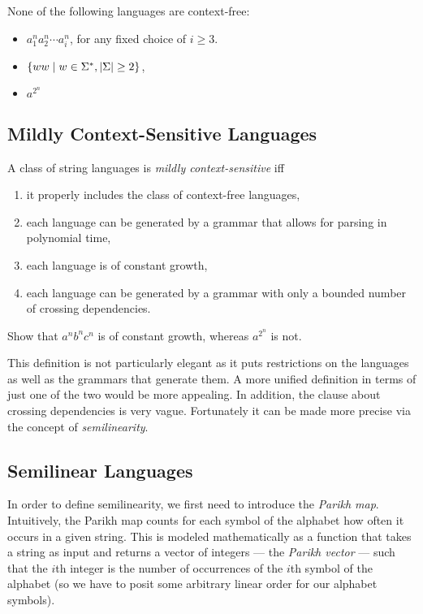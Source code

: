 %
\begin{lemma}
    None of the following languages are context-free:
    \begin{itemize}
        \item $a_1^n a_2^n \cdots a_i^n$, for any fixed choice of $i \geq 3$.
        \item $\left \{ ww \mid w \in \Sigma^*, | \Sigma | \geq 2 \right \}$,
        \item $a^{2^n}$
    \end{itemize}
\end{lemma}

\subsection{Mildly Context-Sensitive Languages}

\begin{definition}
    A class of string languages is \emph{mildly context-sensitive} iff
    \begin{enumerate}
        \item it properly includes the class of context-free languages,
        \item each language can be generated by a grammar that allows for parsing in polynomial time,
        \item each language is of constant growth,
        \item each language can be generated by a grammar with only a bounded number of crossing dependencies.
    \end{enumerate}
\end{definition}
%
\begin{exercise}
    Show that $a^n b^n c^n$ is of constant growth, whereas $a^{2^n}$ is not.
\end{exercise}
%
This definition is not particularly elegant as it puts restrictions on the languages as well as the grammars that generate them.
A more unified definition in terms of just one of the two would be more appealing.
In addition, the clause about crossing dependencies is very vague.
Fortunately it can be made more precise via the concept of \emph{semilinearity}.

\subsection{Semilinear Languages}

In order to define semilinearity, we first need to introduce the \emph{Parikh map}.
Intuitively, the Parikh map counts for each symbol of the alphabet how often it occurs in a given string.
This is modeled mathematically as a function that takes a string as input and returns a vector of integers --- the \emph{Parikh vector} --- such that the $i$th integer is the number of occurrences of the $i$th symbol of the alphabet (so we have to posit some arbitrary linear order for our alphabet symbols).

